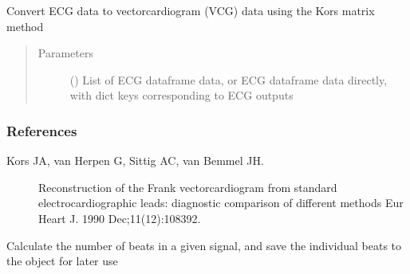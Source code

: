 \documentclass[letterpaper,10pt,english]{sphinxmanual}
\begin{document}
\begin{fulllineitems}
\begin{fulllineitems}
\label{\detokenize{_autosummary/signalanalysis.vcg.Vcg:id0}}
\sphinxAtStartPar
Convert ECG data to vectorcardiogram (VCG) data using the Kors matrix method
\begin{quote}\begin{description}
\item[{Parameters}] \leavevmode
\sphinxAtStartPar
{} ({\hyperref[\detokenize{_autosummary/signalanalysis.ecg.Ecg:signalanalysis.ecg.Ecg}]{}}) \textendash{} List of ECG dataframe data, or ECG dataframe data directly, with dict keys corresponding to ECG outputs

\end{description}\end{quote}
\subsubsection*{References}
\begin{description}
\item[{Kors JA, van Herpen G, Sittig AC, van Bemmel JH.}] \leavevmode
\sphinxAtStartPar
Reconstruction of the Frank vectorcardiogram from standard electrocardiographic leads: diagnostic comparison
of different methods
Eur Heart J. 1990 Dec;11(12):1083\sphinxhyphen{}92.

\end{description}

\end{fulllineitems}


\begin{fulllineitems}
\label{\detokenize{_autosummary/signalanalysis.vcg.Vcg:signalanalysis.vcg.Vcg.get_n_beats}}
\sphinxAtStartPar
Calculate the number of beats in a given signal, and save the individual beats to the object for later use


\end{fulllineitems}
\end{fulllineitems}
\end{document}
